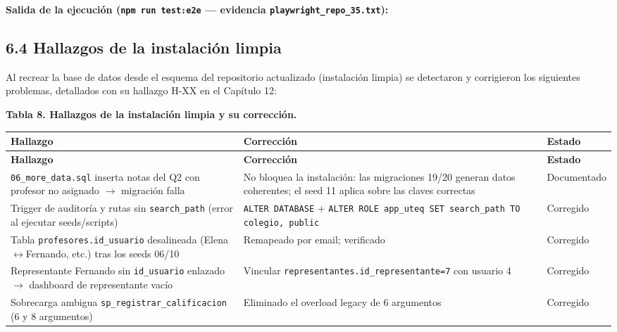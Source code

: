 \documentclass[11pt,a4paper]{article}
\begin{document}
\textbf{Salida de la ejecución (\texttt{npm run test:e2e} --- evidencia \texttt{playwright\_repo\_35.txt}):}


\subsection*{6.4 Hallazgos de la instalación limpia}


Al recrear la base de datos desde el esquema del repositorio actualizado (instalación limpia) se detectaron y corrigieron los siguientes problemas, detallados con su hallazgo H-XX en el Capítulo 12:


\textbf{Tabla 8. Hallazgos de la instalación limpia y su corrección.}


{\small
\begin{longtable}{|p{}|p{}|p{}|}
\rowcolor{UTECblue}\color{white}\bfseries Hallazgo & \color{white}\bfseries Corrección & \color{white}\bfseries Estado \\ \hline
\endfirsthead
\rowcolor{UTECblue}\color{white}\bfseries Hallazgo & \color{white}\bfseries Corrección & \color{white}\bfseries Estado \\ \hline
\endhead
\texttt{06\_more\_data.sql} inserta notas del Q2 con profesor no asignado {$\rightarrow$} migración falla & No bloquea la instalación: las migraciones 19/20 generan datos coherentes; el seed 11 aplica sobre las claves correctas & Documentado \\ \hline
Trigger de auditoría y rutas sin \texttt{search\_path} (error al ejecutar seeds/scripts) & \texttt{ALTER DATABASE} + \texttt{ALTER ROLE app\_uteq SET search\_path TO colegio, public} & {\color{green!60!black}{$\checkmark$}} Corregido \\ \hline
Tabla \texttt{profesores.id\_usuario} desalineada (Elena{$\leftrightarrow$}Fernando, etc.) tras los seeds 06/10 & Remapeado por email; verificado & {\color{green!60!black}{$\checkmark$}} Corregido \\ \hline
Representante Fernando sin \texttt{id\_usuario} enlazado {$\rightarrow$} dashboard de representante vacío & Vincular \texttt{representantes.id\_representante=7} con usuario 4 & {\color{green!60!black}{$\checkmark$}} Corregido \\ \hline
Sobrecarga ambigua \texttt{sp\_registrar\_calificacion} (6 y 8 argumentos) & Eliminado el overload legacy de 6 argumentos & {\color{green!60!black}{$\checkmark$}} Corregido \\ \hline
\end{longtable}}
\end{document}
